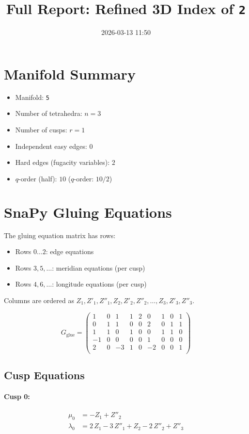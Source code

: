 \documentclass[11pt,a4paper]{article}
\title{Full Report: Refined 3D Index of \texttt{2}}
\date{2026-03-13 11:50}
\begin{document}
\maketitle
\tableofcontents
\newpage

\section{Manifold Summary}
\begin{itemize}
  \item Manifold: \texttt{5}
  \item Number of tetrahedra: $n = 3$
  \item Number of cusps: $r = 1$
  \item Independent easy edges: $0$
  \item Hard edges (fugacity variables): $2$
  \item $q$-order (half): $10$ \quad ($q$-order: $10/2$)
\end{itemize}

\section{SnaPy Gluing Equations}
The gluing equation matrix has rows:
\begin{itemize}
  \item Rows $0\ldots2$: edge equations
  \item Rows $3,5,\ldots$: meridian equations (per cusp)
  \item Rows $4,6,\ldots$: longitude equations (per cusp)
\end{itemize}
Columns are ordered as $Z_1, Z'_1, Z''_1, Z_2, Z'_2, Z''_2, \ldots, Z_3, Z'_3, Z''_3$.

$$
G_{\text{glue}} = 
\begin{pmatrix}
1 & 0 & 1 & 1 & 2 & 0 & 1 & 0 & 1 \\
0 & 1 & 1 & 0 & 0 & 2 & 0 & 1 & 1 \\
1 & 1 & 0 & 1 & 0 & 0 & 1 & 1 & 0 \\
-1 & 0 & 0 & 0 & 0 & 1 & 0 & 0 & 0 \\
2 & 0 & -3 & 1 & 0 & -2 & 0 & 0 & 1 \\
\end{pmatrix}
$$
\subsection*{Cusp Equations}
\paragraph{Cusp 0:}
\begin{align*}
  \mu_0 &= -Z_{1} + Z''_{2} \\
  \lambda_0 &= 2\,Z_{1} - 3\,Z''_{1} + Z_{2} - 2\,Z''_{2} + Z''_{3}
\end{align*}
\end{document}
